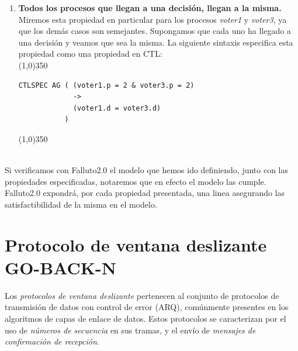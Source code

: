 \documentclass[titlepage, 12pt]{book}
\begin{document}
\begin{enumerate}
\item \textbf{Todos los procesos que llegan a una decisi\'on, llegan a la misma.}\\ Miremos esta propiedad en particular para los procesos \textit{voter1} y \textit{voter3}, ya que los dem\'as casos son semejantes. Supongamos que cada uno ha llegado a una decisi\'on y veamos que sea la misma. La siguiente sintaxis especifica esta propiedad como una propiedad en CTL:\\
\noindent \line(1,0){350}
\begin{verbatim}
CTLSPEC AG ( (voter1.p = 2 & voter3.p = 2) 
             -> 
             (voter1.d = voter3.d)
           )
\end{verbatim}
\noindent \line(1,0){350}
~\\\\

\end{enumerate}

Si verificamos con Falluto2.0 el modelo que hemos ido definiendo, junto con las propiedades especificadas, notaremos que en efecto el modelo las cumple. Falluto2.0 expondr\'a, por cada propiedad presentada, una linea asegurando las satisfactibilidad de la misma en el modelo.



\section{Protocolo de ventana deslizante\\GO-BACK-N}

Los \textit{protocolos de ventana deslizante} pertenecen al conjunto de protocolos de transmisi\'on de datos con control de error (ARQ), com\'unmente presentes en los algoritmos de capas de enlace de datos. Estos protocolos se caracterizan por el uso de \textit{n\'umeros de secuencia} en sus tramas, y el env\'io de \textit{mensajes de confirmaci\'on de recepci\'on}.\\
\end{document}
